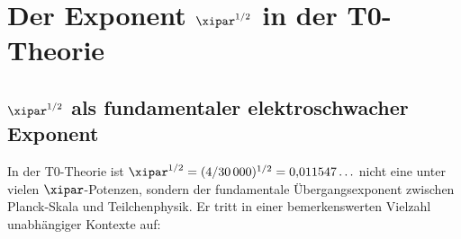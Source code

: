 \clearpage

\section{%
  Der Exponent \texorpdfstring{$\xipar^{1/2}$}{xi\^{}(1/2)} in der T0-Theorie}
\label{sec:xi_halb}

\subsection{%
  \texorpdfstring{$\xipar^{1/2}$}{xi\^{}(1/2)} als fundamentaler
  elektroschwacher Exponent}

In der T0-Theorie ist $\xipar^{1/2} = (4/30\,000)^{1/2} = 0{,}011547\ldots$
nicht eine unter vielen $\xipar$-Potenzen, sondern der fundamentale
Übergangsexponent zwischen Planck-Skala und Teilchenphysik. Er tritt in
einer bemerkenswerten Vielzahl unabhängiger Kontexte auf:

\begin{table}[H]
    \centering
    \caption{Der Exponent $\xipar^{1/2} = 0{,}011547$ tritt in der T0-Theorie
    als universeller elektroschwacher Exponent auf. Er markiert den geometrischen
    Übergang von der Planck-Welt zur Teilchenphysik-Skala. Die PPLN-Dispersion
    reiht sich in dieselbe Hierarchie ein wie $\alpha_W$ und $m_e/m_\mu$.}
    \label{tab:xi12}
\end{table}

